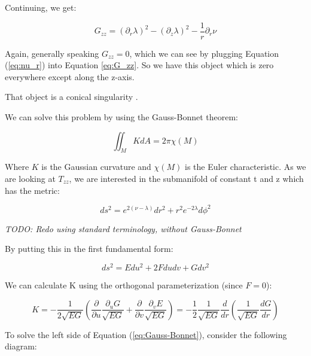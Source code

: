 \documentclass{article}
\begin{document}
Continuing, we get:

\begin{equation}
G_{zz}=\left(\partial_{r}\lambda\right)^{2}-\left(\partial_{z}\lambda\right)^{2}-\frac{1}{r}\partial_{r}\nu \label{eq:G_zz}
\end{equation}

Again, generally speaking $G_{zz}=0$, which we can see by plugging Equation (\ref{eq:nu_r}) into Equation \eqref{eq:G_zz}. So we have this object which is zero everywhere except along the z-axis.

That object is a conical singularity \cite{araujo_static_1995}.

We can solve this problem by using the Gauss-Bonnet theorem: \cite{weisstein_gauss-bonnet}

\begin{equation}
\iint_{M} KdA=2\pi\chi (M)\label{eq:Gauss-Bonnet}
\end{equation}

Where $K$ is the Gaussian curvature and $\chi (M)$ is the Euler characteristic. As we are looking at $T_{zz}$, we are interested in the submanifold of constant t and z which has the metric:

\begin{equation}
ds^{2}=e^{2\left(\nu-\lambda\right)}dr^{2}+r^{2}e^{-2\lambda}d\phi^{2}\label{eq:disk-metric}
\end{equation}

\emph{TODO: Redo using standard terminology, without Gauss-Bonnet}

By putting this in the first fundamental form\cite{first_fundamental-form}:

\begin{equation}
ds^{2}=Edu^{2}+2Fdudv+Gdv^{2}
\end{equation}

We can calculate K using the orthogonal parameterization\cite{schleifer_condition_1985} (since $F=0$):

\begin{equation}
K=-\frac{1}{2\sqrt{EG}}\left(\frac{\partial}{\partial u}\frac{\partial_{u}G}{\sqrt{EG}}+\frac{\partial}{\partial v}\frac{\partial_{v}E}{\sqrt{EG}}\right)=-\frac{1}{2}\frac{1}{\sqrt{EG}}\frac{d}{dr}\left(\frac{1}{\sqrt{EG}}\frac{dG}{dr}\right)
\end{equation}

To solve the left side of Equation (\ref{eq:Gauss-Bonnet}), consider the following diagram:
\end{document}
